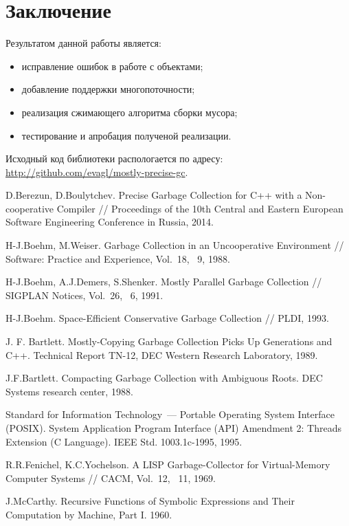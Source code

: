 \section*{Заключение}
Результатом данной работы является:

\begin{itemize}
\item исправление ошибок в работе с объектами; 
\item добавление поддержки многопоточности;
\item реализация сжимающего алгоритма сборки мусора;
\item тестирование и апробация полученой реализации.
\end{itemize}

Исходный код библиотеки распологается по адресу: \url{http://github.com/evagl/mostly-precise-gc}.

\begin{thebibliography}{99}
 D.Berezun, D.Boulytchev. Precise Garbage Collection for C++ with a Non-cooperative Compiler //
 Proceedings of the 10th Central and Eastern European Software Engineering Conference in Russia, 2014.

 H-J.Boehm, M.Weiser. Garbage Collection in an Uncooperative Environment //
 Software: Practice and Experience, Vol.~18, \textnumero~9, 1988.

 H-J.Boehm, A.J.Demers, S.Shenker. Mostly Parallel Garbage Collection //
 SIGPLAN Notices, Vol.~26, \textnumero~6, 1991.

 H-J.Boehm. Space-Efficient Conservative Garbage Collection // 
 PLDI, 1993.

 J. F. Bartlett. Mostly-Copying Garbage Collection Picks Up Generations and C++.
 Technical Report TN-12, DEC Western Research Laboratory, 1989.

 J.F.Bartlett. Compacting Garbage Collection with Ambiguous Roots. DEC Systems research center,
 1988.

 Standard for Information Technology~--- Portable Operating System Interface (POSIX). 
 System Application Program Interface (API) Amendment 2: Threads Extension (C Language).
 IEEE Std. 1003.1c-1995, 1995.

 R.R.Fenichel, K.C.Yochelson.
 A LISP Garbage-Collector for Virtual-Memory Computer Systems //
 CACM, Vol.~12, \textnumero~11, 1969.

 J.McCarthy. Recursive Functions of Symbolic Expressions and Their Computation by Machine, Part I.
 1960.
\end{thebibliography}
